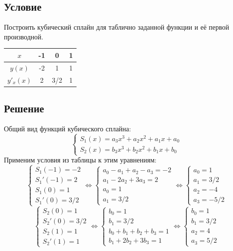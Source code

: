 \documentclass[a4paper, 12pt]{article}
\begin{document}
	\subsection*{Условие}
	Построить кубический сплайн для таблично заданной функции и её первой производной.
	\begin{table}[h]
		\centering
		\begin{tabular}{|c|c|c|c|}
		\hline
		$x$ & -1 & 0 & 1\\
		\hline
		$y(x)$ & -2 & 1 & 1\\
		\hline
		$y'_x(x)$ & 2 & 3/2 & 1\\
		\hline		
		\end{tabular}
	\end{table}
	\subsection*{Решение}
	Общий вид функций кубического сплайна:
	\begin{equation*}
	\begin{cases}
	S_1(x)=a_3x^3+a_2x^2+a_1x+a_0\\
	S_2(x)=b_3x^3+b_2x^2+b_1x+b_0
	\end{cases}
	\end{equation*}
	Применим условия из таблицы к этим уравнениям:
	\begin{equation*}
	\begin{cases}
	S_1(-1)=-2\\
	S_1'(-1)=2\\
	S_1(0)=1\\
	S_1'(0)=3/2
	\end{cases}\Leftrightarrow
	\begin{cases}
	a_0-a_1+a_2-a_3=-2\\
	a_1-2a_2+3a_3=2\\
	a_0=1\\
	a_1=3/2
	\end{cases}\Leftrightarrow
	\begin{cases}
	a_0=1\\
	a_1=3/2\\
	a_2=-4\\
	a_3=-5/2
	\end{cases}
	\end{equation*}
	\begin{equation*}
	\begin{cases}
	S_2(0)=1\\
	S_2'(0)=3/2\\
	S_2(1)=1\\
	S_2'(1)=1
	\end{cases}\Leftrightarrow
	\begin{cases}
	b_0=1\\
	b_1=3/2\\
	b_0+b_1+b_2+b_3=1\\
	b_1+2b_2+3b_3=1
	\end{cases}\Leftrightarrow
	\begin{cases}
	b_0=1\\
	b_1=3/2\\
	a_2=4\\
	a_3=5/2
	\end{cases}
	\end{equation*}
\end{document}
